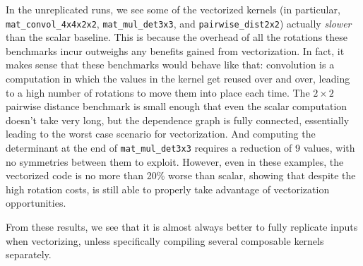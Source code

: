In the unreplicated runs, we see some of the vectorized kernels (in particular, \texttt{mat\_convol\_4x4x2x2}, \texttt{mat\_mul\_det3x3}, and \texttt{pairwise\_dist2x2}) actually {\em slower} than the scalar baseline.
This is because the overhead of all the rotations these benchmarks incur outweighs any benefits gained from vectorization.
In fact, it makes sense that these benchmarks would behave like that: convolution is a computation in which the values in the kernel get reused over and over, leading to a high number of rotations to move them into place each time.
The $2\times 2$ pairwise distance benchmark is small enough that even the scalar computation doesn't take very long, but the dependence graph is fully connected, essentially leading to the worst case scenario for vectorization.
And computing the determinant at the end of \texttt{mat\_mul\_det3x3} requires a reduction of 9 values, with no symmetries between them to exploit.
However, even in these examples, the vectorized code is no more than 20\% worse than scalar, showing that despite the high rotation costs, \system is still able to properly take advantage of vectorization opportunities.


From these results, we see that it is almost always better to fully replicate inputs when vectorizing, unless specifically compiling several composable kernels separately.


